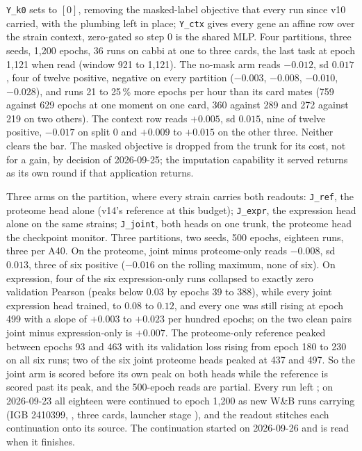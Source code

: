 \texttt{Y\_k0} sets  to $[0]$, removing the masked-label
objective that every run since v10 carried, with the plumbing left in place;
\texttt{Y\_ctx} gives every gene an affine row over the strain context, zero-gated so step
0 is the shared MLP. Four partitions, three seeds, 1{,}200 epochs, 36 runs on cabbi at
one to three cards, the last task at epoch 1{,}121 when read (window 921 to 1{,}121). The
no-mask arm reads $-0.012$, sd $0.017$, four of twelve positive, negative on every
partition ($-0.003$, $-0.008$, $-0.010$, $-0.028$), and runs 21 to 25\,\% more epochs per
hour than its card mates (759 against 629 epochs at one moment on one card, 360 against
289 and 272 against 219 on two others). The context row reads $+0.005$, sd $0.015$, nine
of twelve positive, $-0.017$ on split 0 and $+0.009$ to $+0.015$ on the other three.
Neither clears the bar. The masked objective is dropped from the trunk for its cost, not
for a gain, by decision of 2026-09-25; the imputation capability it served returns as its
own round if that application returns.

 Three arms on the
 partition, where every strain carries both readouts: \texttt{J\_ref},
the proteome head alone (v14's reference at this budget); \texttt{J\_expr}, the expression
head alone on the same strains; \texttt{J\_joint}, both heads on one trunk, the proteome
head the checkpoint monitor. Three partitions, two seeds, 500 epochs, eighteen runs, three
per A40. On the proteome, joint minus proteome-only reads $-0.008$, sd $0.013$, three of
six positive ($-0.016$ on the rolling maximum, none of six). On expression, four of the six
expression-only runs collapsed to exactly zero validation Pearson (peaks below $0.03$ by
epochs 39 to 388), while every joint expression head trained, to $0.08$ to $0.12$, and every
one was still rising at epoch 499 with a slope of $+0.003$ to $+0.023$ per hundred epochs;
on the two clean pairs joint minus expression-only is $+0.007$. The proteome-only reference
peaked between epochs 93 and 463 with its validation loss rising from epoch 180 to 230 on
all six runs; two of the six joint proteome heads peaked at 437 and 497. So the joint arm is
scored before its own peak on both heads while the reference is scored past its peak, and
the 500-epoch reads are partial. Every run left ; on 2026-09-23 all
eighteen were continued to epoch 1{,}200 as new W\&B runs carrying 
(IGB 2410399, , three cards, launcher stage ), and the readout
stitches each continuation onto its source. The continuation started on 2026-09-26 and is
read when it finishes.

